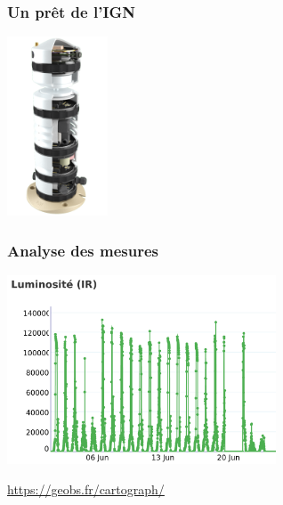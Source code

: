 \documentclass[svgnames,11pt]{beamer}
\begin{document}
\begin{frame}
    \frametitle{Un prêt de l'IGN}

\begin{center}
\centering
\includegraphics[width=3cm]{ressources/geocube-interne.png}
\label{IMG}
\end{center}
\end{frame}
\begin{frame}
    \frametitle{Analyse des mesures}

\begin{center}
\centering
\includegraphics[width=8cm]{ressources/pression.png}
\label{IMG}
\end{center}
\begin{center}
    {\Large \url{https://geobs.fr/cartograph/}}
\end{center}
\end{frame}
\end{document}
